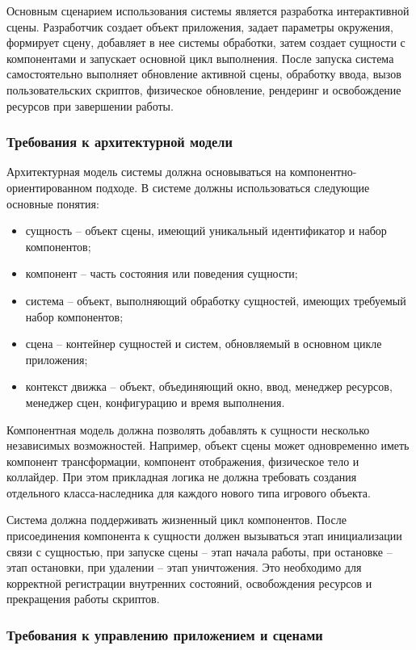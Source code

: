 Основным сценарием использования системы является разработка интерактивной сцены. Разработчик создает объект приложения, задает параметры окружения, формирует сцену, добавляет в нее системы обработки, затем создает сущности с компонентами и запускает основной цикл выполнения. После запуска система самостоятельно выполняет обновление активной сцены, обработку ввода, вызов пользовательских скриптов, физическое обновление, рендеринг и освобождение ресурсов при завершении работы.

\subsubsection{Требования к архитектурной модели}

Архитектурная модель системы должна основываться на компонентно-ориентированном подходе. В системе должны использоваться следующие основные понятия:
\begin{itemize}
\item сущность -- объект сцены, имеющий уникальный идентификатор и набор компонентов;
\item компонент -- часть состояния или поведения сущности;
\item система -- объект, выполняющий обработку сущностей, имеющих требуемый набор компонентов;
\item сцена -- контейнер сущностей и систем, обновляемый в основном цикле приложения;
\item контекст движка -- объект, объединяющий окно, ввод, менеджер ресурсов, менеджер сцен, конфигурацию и время выполнения.
\end{itemize}

Компонентная модель должна позволять добавлять к сущности несколько независимых возможностей. Например, объект сцены может одновременно иметь компонент трансформации, компонент отображения, физическое тело и коллайдер. При этом прикладная логика не должна требовать создания отдельного класса-наследника для каждого нового типа игрового объекта.

Система должна поддерживать жизненный цикл компонентов. После присоединения компонента к сущности должен вызываться этап инициализации связи с сущностью, при запуске сцены -- этап начала работы, при остановке -- этап остановки, при удалении -- этап уничтожения. Это необходимо для корректной регистрации внутренних состояний, освобождения ресурсов и прекращения работы скриптов.

\subsubsection{Требования к управлению приложением и сценами}

